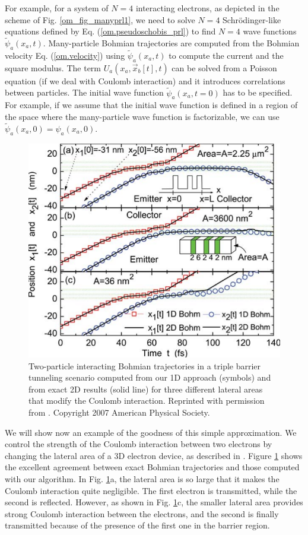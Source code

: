 \documentclass[nofootinbib, secnumarabic, amsmath, nobibnotes,11pt,aps,pra, floatfix]{revtex4-1}
\newcommand{\fref}[1]{Fig. \ref{#1}}
\newcommand{\eref}[1]{Eq. (\ref{#1})}
\newcommand{\Fref}[1]{Figure \ref{#1}}
\begin{document}
For example, for a system of $N = 4$ interacting electrons, as
depicted in the scheme  of \fref{om_fig_manyprl1}, we need to solve
$N = 4$ Schr\"odinger-like  equations defined by  \eref{om.pseudoschobis_prl} to find $N =
4$ wave functions $\tilde{\psi}_a(x_a,t)$. Many-particle Bohmian
trajectories are computed from the Bohmian velocity
\eref{om.velocity} using $\tilde{\psi}_a(x_a,t)$ to compute the
current and the square modulus. The term \textit{$U_{a}(x_{a},\vec
x_{b}[t],t)$} can be solved from a Poisson equation (if we deal with
Coulomb interaction) and it introduces correlations between
particles. The initial wave function $\tilde{\psi}_a(x_a,t = 0)$ has
to be specified. For example, if we assume that the initial wave
function is defined in a region of the space where the many-particle
wave function is factorizable, we can use $\tilde{\psi}_a(x_a,0) =
{\psi}_a(x_a,0)$.

\begin{figure}
\centering
\includegraphics{F1_05.pdf}
\caption{Two-particle interacting Bohmian trajectories in a triple barrier tunneling scenario
computed from our 1D approach (symbols) and from exact 2D results
(solid line) for three different lateral areas that modify the
Coulomb interaction. Reprinted with permission from
\cite{om.oriolsprl}. Copyright 2007 American Physical Society.}
\label{om_fig_prl1}
\end{figure}

We will show now an example of the goodness of this simple
approximation. We control the strength of the Coulomb interaction
between two electrons by changing the lateral area of a 3D electron
device, as described in \cite{om.oriolsprl}. \Fref{om_fig_prl1}
shows the excellent agreement between exact Bohmian trajectories and
those computed with our algorithm. In \fref{om_fig_prl1}a, the
lateral area is so large that it makes the Coulomb interaction quite
negligible. The first electron is transmitted, while the second is
reflected. However, as shown in \fref{om_fig_prl1}c, the smaller lateral area
provides strong Coulomb interaction between the electrons, and the
second is finally transmitted because of the presence of the first
one in the barrier region.
\end{document}
